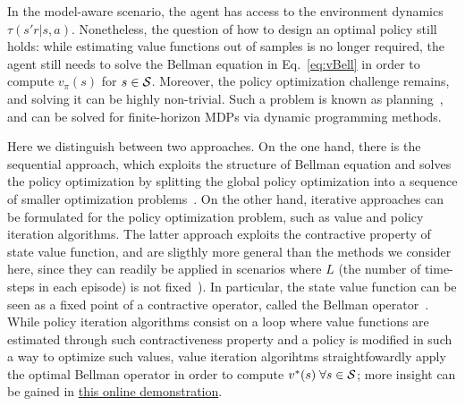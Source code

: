 In the model-aware scenario, the agent has access to the environment dynamics $\tau(s'r | s,a)$. Nonetheless, the question of how to design an optimal policy still holds: while estimating value functions out of samples is no longer required, the agent still needs to solve the Bellman equation in Eq.~\ref{eq:vBell} in order to compute $v_\pi(s)$ for $s\in\mathcal{S}$. Moreover, the policy optimization challenge remains, and solving it can be highly non-trivial. Such a problem is known as planning~\cite{Sutton2018}, and can be solved for finite-horizon MDPs via dynamic programming methods.

Here we distinguish between two approaches. On the one hand, there is the sequential approach, which exploits the structure of Bellman equation and solves the policy optimization by splitting the global policy optimization into a sequence of smaller optimization problems~\cite{Bellman2003}. On the other hand, iterative approaches can be formulated for the policy optimization problem, such as value and policy iteration algorithms. The latter approach exploits the contractive property of state value function, and are sligthly more general than the methods we consider here, since they can readily be applied in scenarios where  $L$ (the number of time-steps in each episode) is not fixed~\cite{Sutton2018}). In particular, the state value function can be seen as a fixed point of a contractive operator, called the Bellman operator~\cite{AlgorithmsRLCsaba}. While policy iteration algorithms consist on a loop where value functions are estimated through such contractiveness property and a policy is modified in such a way to optimize such values, value iteration algorihtms straightfowardly apply the optimal Bellman operator in order to compute $v^*(s)\; \forall s\in\mathcal{S}$; more insight can be gained in \href{https://cs.stanford.edu/people/karpathy/reinforcejs/gridworld_dp.html}{this online demonstration}.

